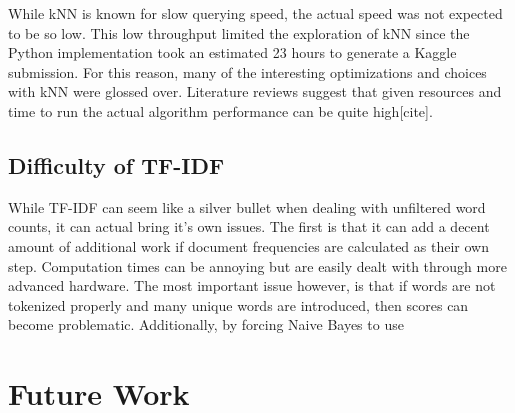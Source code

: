 \documentclass[10pt,twocolumn]{article}
\begin{document}
While kNN is known for slow querying speed, the actual speed was not expected to be so low. This low throughput limited the exploration of kNN since the Python implementation took an estimated 23 hours to generate a Kaggle submission. For this reason, many of the interesting optimizations and choices with kNN were glossed over. Literature reviews suggest that given resources and time to run the actual algorithm performance can be quite high[cite].

\subsection*{Difficulty of TF-IDF}

While TF-IDF can seem like a silver bullet when dealing with unfiltered word counts, it can actual bring it's own issues. The first is that it can add a decent amount of additional work if document frequencies are calculated as their own step. Computation times can be annoying but are easily dealt with through more advanced hardware. The most important issue however, is that if words are not tokenized properly and many unique words are introduced, then scores can become problematic. Additionally, by forcing Naive Bayes to use 

\section*{Future Work}
\end{document}
